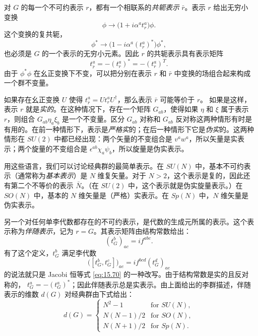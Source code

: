 对 $G$ 的每一个不可约表示 $r$，都有一个相联系的\emph{共轭表示} $\bar{r}$。表示 $r$ 给出无穷小变换
\begin{equation}
  \phi \to \bigl( 1 + i\alpha^a t^a_r \bigr)\phi .
  \label{eq:15.80}
\end{equation}
这个变换的复共轭，
\begin{equation}
  \phi^{*} \to \bigl( 1 - i\alpha^a (t^a_r)^{*} \bigr)\phi^{*} ,
  \label{eq:15.81}
\end{equation}
也必须是 $G$ 的一个表示的无穷小元素。因此 $r$ 的共轭表示具有表示矩阵
\begin{equation}
  t^a_{\bar{r}} = -(t^a_r)^{*} = -(t^a_r)^T .
  \label{eq:15.82}
\end{equation}
由于 $\phi^{*}\phi$ 在幺正变换下不变，可以把分别在表示 $r$ 和 $\bar{r}$ 中变换的场组合起来构成一个群不变量。

如果存在幺正变换 $U$ 使得
$t^a_{\bar{r}} = Ut^a_rU^{\dagger}$，那么表示 $\bar{r}$ 可能等价于 $r$。
如果是这样，表示 $r$ 就是\emph{实的}。在这种情况下，存在一个矩阵 $G_{ab}$，使得如果 $\eta$ 和
$\xi$ 属于表示 $r$，则组合
$G_{ab}\eta_a\xi_b$ 是一个不变量。区分 $G_{ab}$ 对称和 $G_{ab}$ 反对称这两种情形有时是有用的。在前一种情形下，表示是\emph{严格实}的；在后一种情形下它是\emph{伪实}的。这两种情形在 $SU(2)$ 中都已经出现：两个矢量的不变组合是 $v^aw^a$，所以矢量是实表示；两个旋量的不变组合是 $\epsilon^{ab}\chi_a\psi_b$，所以旋量是伪实表示。

用这些语言，我们可以讨论经典群的最简单表示。在 $SU(N)$ 中，基本不可约表示（通常称为\emph{基本表示}）是 $N$ 维复矢量。对于 $N > 2$，这个表示是复的，因此还有第二个不等价的表示 $\bar{N}$。（在 $SU(2)$ 中，这个表示就是伪实旋量表示。）在 $SO(N)$ 中，基本的 $N$ 维矢量是（严格）实表示。在 $Sp(N)$ 中，$N$ 维矢量是伪实表示。

另一个对任何单李代数都存在的不可约表示，是代数的生成元所属的表示。这个表示称为\emph{伴随表示}，记为 $r = G$。其表示矩阵由结构常数给出：
\begin{equation}
  (t^b_G)_{ac} = if^{abc} .
  \label{eq:15.83}
\end{equation}
有了这个定义，$t^b_G$ 满足李代数
\begin{equation}
  \bigl( [t^b_G, t^c_G] \bigr)_{ae} = if^{bcd}(t^d_G)_{ae}
  \label{eq:15.84}
\end{equation}
的说法就只是 Jacobi 恒等式 \eqref{eq:15.70} 的一种改写。由于结构常数是实的且反对称的，
$t^a_G = -(t^a_G)^{*}$；因此伴随表示总是实表示。由上面给出的李群描述，伴随表示的维数 $d(G)$ 对经典群由下式给出：
\begin{equation}
  d(G) = \begin{cases}
    N^2-1 & \text{for } SU(N),\\
    N(N-1)/2 & \text{for } SO(N),\\
    N(N+1)/2 & \text{for } Sp(N) .
  \end{cases}
  \label{eq:15.85}
\end{equation}

